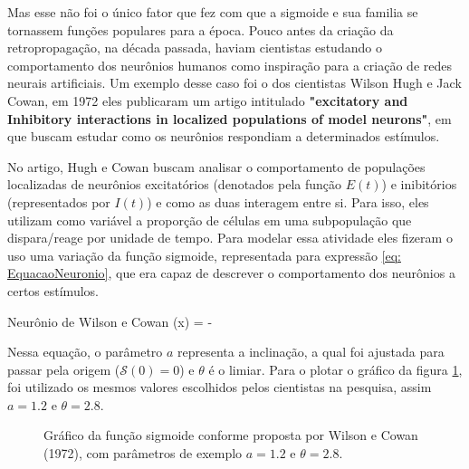 Mas esse não foi o único fator que fez com que a sigmoide e sua familia se tornassem funções populares para a época. Pouco antes da criação da retropropagação, na década passada, haviam cientistas estudando o comportamento dos neurônios humanos como inspiração para a criação de redes neurais artificiais. Um exemplo desse caso foi o dos cientistas Wilson Hugh e Jack Cowan, em 1972 eles publicaram um artigo intitulado \textbf{"excitatory and Inhibitory interactions in localized populations of model neurons"}, em que buscam estudar como os neurônios respondiam a determinados estímulos.

No artigo, Hugh e Cowan buscam analisar o comportamento de populações localizadas de neurônios excitatórios (denotados pela função $E(t)$) e inibitórios (representados por $I(t)$) e como as duas interagem entre si. Para isso, eles utilizam como variável a proporção de células em uma subpopulação que dispara/reage por unidade de tempo. Para modelar essa atividade eles fizeram o uso uma variação da função sigmoide, representada para expressão \ref{eq: EquacaoNeuronio}, que era capaz de descrever o comportamento dos neurônios a certos estímulos.

\begin{equacaodestaque}{Neurônio de Wilson e Cowan}
    (x) =  - 
    \label{eq:neuronio-de-wilson-cowan}
\end{equacaodestaque}


Nessa equação, o parâmetro $a$ representa a inclinação, a qual foi ajustada para passar pela origem ($\mathcal{S}(0) = 0$) e $\theta$ 
é o limiar. Para o plotar o gráfico da figura \ref{fig: ComportamentoNeuronios}, foi utilizado os mesmos valores escolhidos pelos cientistas na pesquisa, assim $a = 1.2$ e $\theta = 2.8$.

\begin{figure}[h!]


    \centering
    \caption{Gráfico da função sigmoide conforme proposta por Wilson e Cowan (1972), com parâmetros de exemplo $a=1.2$ e $\theta=2.8$.}
    \label{fig: ComportamentoNeuronios}
\end{figure}


